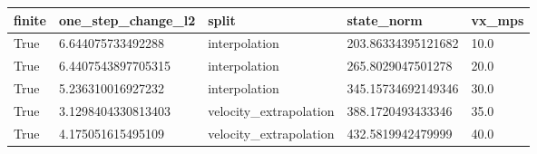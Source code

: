 \begin{tabular}{lllll}
 \toprule
finite & one\_step\_change\_l2 & split & state\_norm & vx\_mps \\ \midrule
True & 6.644075733492288 & interpolation & 203.86334395121682 & 10.0 \\
True & 6.4407543897705315 & interpolation & 265.8029047501278 & 20.0 \\
True & 5.236310016927232 & interpolation & 345.15734692149346 & 30.0 \\
True & 3.1298404330813403 & velocity\_extrapolation & 388.1720493433346 & 35.0 \\
True & 4.175051615495109 & velocity\_extrapolation & 432.5819942479999 & 40.0 \\
\bottomrule
\end{tabular}
